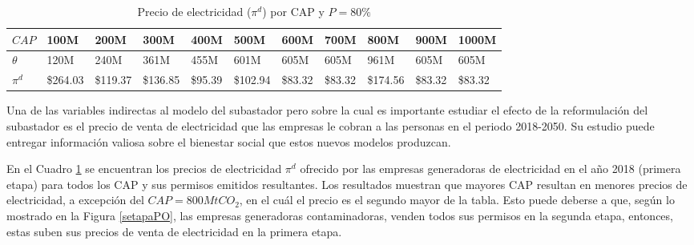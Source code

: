 \begin{table}[H]
\begin{footnotesize}
    \centering
    \begin{tabular}{|l|l|l|l|l|l|l|l|l|l|l|}
    \hline
        $CAP$ & 100M & 200M & 300M & 400M & 500M & 600M & 700M & 800M & 900M & 1000M \\ \hline
        $\theta$  & 120M & 240M & 361M & 455M & 601M & 605M & 605M & 961M & 605M & 605M \\ \hline
        $\pi^d$  &  \$264.03   &  \$119.37   &  \$136.85   &  \$95.39   &  \$102.94   &  \$83.32   &  \$83.32   &  \$174.56   &  \$83.32   &  \$83.32   \\ \hline
    \end{tabular}
    \caption{{\footnotesize Precio de electricidad ($\pi^d$) por CAP y $P=80\%$}}
    \label{POpidporcap}
\end{footnotesize}
\end{table}

Una de las variables indirectas al modelo del subastador pero sobre la cual es importante estudiar el efecto de la reformulación del subastador es el precio de venta de electricidad que las empresas le cobran a las personas en el periodo 2018-2050. Su estudio puede entregar información valiosa sobre el bienestar social que estos nuevos modelos produzcan.
\vspace{2.5mm}

En el Cuadro \ref{POpidporcap} se encuentran los precios de electricidad $\pi^d$ ofrecido por las empresas generadoras de electricidad en el año 2018 (primera etapa) para todos los CAP y sus permisos emitidos resultantes. Los resultados muestran que mayores CAP resultan en menores precios de electricidad, a excepción del $CAP= 800MtCO_2$, en el cuál el precio es el segundo mayor de la tabla. Esto puede deberse a que, según lo mostrado en la Figura \ref{setapaPO}, las empresas generadoras contaminadoras, venden todos sus permisos en la segunda etapa, entonces, estas suben sus precios de venta de electricidad en la primera etapa.
\vspace{2.5mm}

